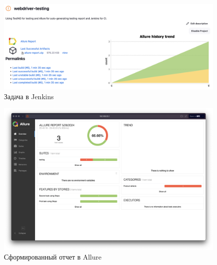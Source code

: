 \documentclass[a4paper]{article}
\begin{document}
    \begin{figure}[H]
        \centering
        \begin{minipage}[t]{\textwidth}
            \includegraphics[width=\textwidth]{images/jenkins-allure-result.png}
        \end{minipage}
        \caption{Задача в Jenkins}
    \end{figure}
    \begin{figure}[H]
        \centering
        \begin{minipage}[t]{\textwidth}
            \includegraphics[width=\textwidth]{images/allure-result.png}
        \end{minipage}
        \caption{Сформированный отчет в Allure}
    \end{figure}
    \newpage
\end{document}
